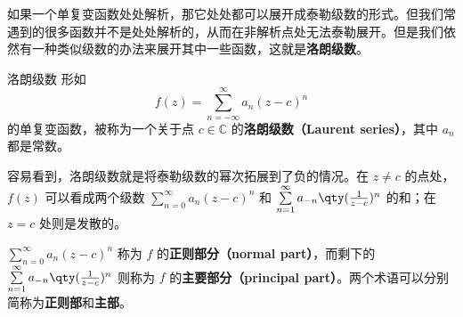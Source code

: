 

如果一个单复变函数处处解析，那它处处都可以展开成泰勒级数的形式。但我们常遇到的很多函数并不是处处解析的，从而在非解析点处无法泰勒展开。但是我们依然有一种类似级数的办法来展开其中一些函数，这就是\textbf{洛朗级数}。

\begin{definition}{洛朗级数}
形如
\begin{equation}
f(z)=\sum\limits_{n=-\infty}^{\infty} a_n(z-c)^n
\end{equation}
的单复变函数，被称为一个关于点 $c\in\mathbb{C}$ 的\textbf{洛朗级数（Laurent series）}，其中 $a_n$ 都是常数。


\end{definition}

容易看到，洛朗级数就是将泰勒级数的幂次拓展到了负的情况。在 $z\neq c$ 的点处，$f(z)$ 可以看成两个级数 $\sum\limits_{n=0}^{\infty} a_n(z-c)^n$ 和 $\sum\limits_{n=1}^{\infty} a_{-n}\qty(\frac{1}{z-c})^n$ 的和；在 $z=c$ 处则是发散的。

$\sum\limits_{n=0}^{\infty} a_n(z-c)^n$ 称为 $f$ 的\textbf{正则部分（normal part）}，而剩下的 $\sum\limits_{n=1}^{\infty} a_{-n}\qty(\frac{1}{z-c})^n$ 则称为 $f$ 的\textbf{主要部分（principal part）}。两个术语可以分别简称为\textbf{正则部}和\textbf{主部}。



















